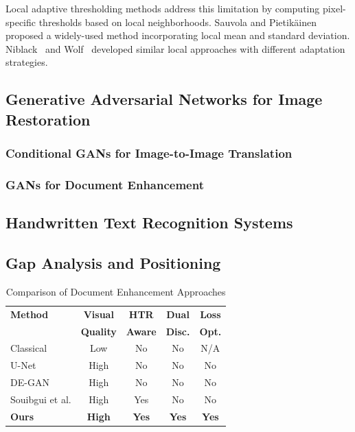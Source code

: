 \documentclass[journal]{IEEEtran}
\begin{document}
Local adaptive thresholding methods address this limitation by computing pixel-specific thresholds based on local neighborhoods. Sauvola and Pietikäinen~\cite{sauvola2000adaptive} proposed a widely-used method incorporating local mean and standard deviation. Niblack~\cite{niblack1986introduction} and Wolf~\cite{wolf2004extraction} developed similar local approaches with different adaptation strategies.


\subsection{Generative Adversarial Networks for Image Restoration}

\subsubsection{Conditional GANs for Image-to-Image Translation}


\subsubsection{GANs for Document Enhancement}


\subsection{Handwritten Text Recognition Systems}


\subsection{Gap Analysis and Positioning}


\begin{table}[!t]
\renewcommand{\arraystretch}{1.3}
\caption{Comparison of Document Enhancement Approaches}
\label{table_comparison}
\centering
\begin{tabular}{|l|c|c|c|c|}
\hline
\textbf{Method} & \textbf{Visual} & \textbf{HTR} & \textbf{Dual} & \textbf{Loss} \\
 & \textbf{Quality} & \textbf{Aware} & \textbf{Disc.} & \textbf{Opt.} \\
\hline
Classical & Low & No & No & N/A \\
U-Net & High & No & No & No \\
DE-GAN & High & No & No & No \\
Souibgui et al. & High & Yes & No & No \\
\textbf{Ours} & \textbf{High} & \textbf{Yes} & \textbf{Yes} & \textbf{Yes} \\
\hline
\end{tabular}
\end{table}
\end{document}
